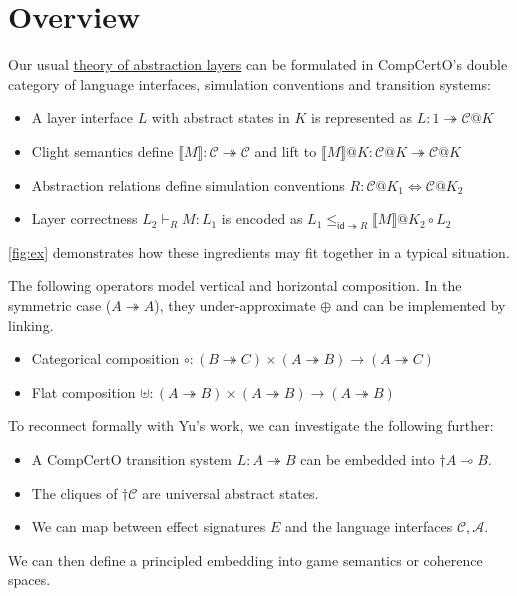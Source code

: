 \documentclass{article}
\begin{document}
\vfill

\section{Overview}

Our usual
\href{https://certikos.github.io/rbgs-papers/thesis/thesis.pdf\#chapter.4}%
  {theory of abstraction layers}
can be formulated in CompCertO's double category of
language interfaces, simulation conventions and transition systems:
\begin{itemize}
  \item A layer interface $L$ with abstract states in $K$
    is represented as $L : 1 \twoheadrightarrow \mathcal{C}@K$
  \item Clight semantics define
    $\llbracket M \rrbracket : \mathcal{C} \twoheadrightarrow \mathcal{C}$
    and lift to
    $\llbracket M \rrbracket @ K :
     \mathcal{C}@K \twoheadrightarrow \mathcal{C}@K$
  \item Abstraction relations define simulation conventions
    $R : \mathcal{C}@K_1 \Leftrightarrow \mathcal{C}@K_2$
  \item Layer correctness
    $L_2 \vdash_R M : L_1$
    is encoded as
    $L_1 \le_{\mathsf{id} \twoheadrightarrow R}
     \llbracket M \rrbracket @K_2 \circ L_2$
\end{itemize}
\autoref{fig:ex}
demonstrates how these ingredients may fit together
in a typical situation.

\newpage
The following operators
model vertical and horizontal composition.
In the symmetric case ($A \twoheadrightarrow A$),
they under-approximate $\oplus$
and can be implemented by linking.
\begin{itemize}
  \item Categorical composition \hfill
    $\circ :
      (B \twoheadrightarrow C) \times
      (A \twoheadrightarrow B) \rightarrow
      (A \twoheadrightarrow C) \qquad$
  \item Flat composition \hfill
    $\uplus :
      (A \twoheadrightarrow B) \times
      (A \twoheadrightarrow B) \rightarrow
      (A \twoheadrightarrow B) \qquad$
\end{itemize}
To reconnect formally with Yu's work,
we can investigate the following further:
\begin{itemize}
  \item A CompCertO transition system $L : A \twoheadrightarrow B$
    can be embedded into $\dagger A \multimap B$.
  \item The cliques of $\dagger \mathcal{C}$
    are universal abstract states.
  \item We can map between effect signatures $E$
    and the language interfaces $\mathcal{C}, \mathcal{A}$.
\end{itemize}
We can then define
a principled embedding
into game semantics or coherence spaces.
\end{document}
